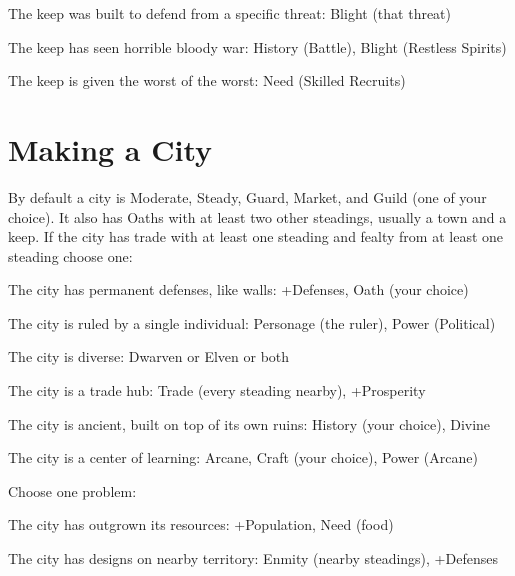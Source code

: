  
\item The keep was built to defend from a specific threat: Blight (that threat)

 
\item The keep has seen horrible bloody war: History (Battle), Blight (Restless Spirits)

 
\item The keep is given the worst of the worst: Need (Skilled Recruits)


\stopitemize
 
\section{Making a City}   
 

By default a city is Moderate, Steady, Guard, Market, and Guild (one of your choice). It also has Oaths with at least two other steadings, usually a town and a keep. If the city has trade with at least one steading and fealty from at least one steading choose one:

 
\startitemize[1,packed]

\item The city has permanent defenses, like walls: +Defenses, Oath (your choice)

 
\item The city is ruled by a single individual: Personage (the ruler), Power (Political)

 
\item The city is diverse: Dwarven or Elven or both

 
\item The city is a trade hub: Trade (every steading nearby), +Prosperity

 
\item The city is ancient, built on top of its own ruins: History (your choice), Divine

 
\item The city is a center of learning: Arcane, Craft (your choice), Power (Arcane)


\stopitemize
 

Choose one problem:

 
\startitemize[1,packed]

\item The city has outgrown its resources: +Population, Need (food)

 
\item The city has designs on nearby territory: Enmity (nearby steadings), +Defenses

